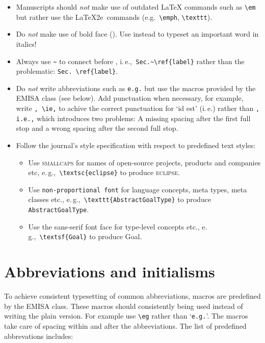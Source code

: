 \documentclass[a4paper]{ltxdoc}
\providecommand*\pkg[1]{\textsf{#1}}
\begin{document}
\begin{itemize}

\item Manuscripts should \emph{not} make use of outdated \LaTeX{} commands such as \verb|\em| but rather use the \LaTeX2e\ commands (e.g.\ \verb|\emph|, \verb|\texttt|). 


\item Do \emph{not} make use of bold face (). Use  instead to typeset an important word in italics!

\item Always use \verb|~| to connect before , i.\,e.,\ \verb|Sec.~\ref{label}| rather than the problematic: \verb|Sec. \ref{label}|.

\item Do \emph{not} write abbreviations such as \verb|e.g.| but use the macros provided by the \pkg{EMISA} class (see below). Add punctuation when necessary, for example, write \verb|, \ie,| to achive the correct punctuation for ‘id est’ (i.\,e.) rather than \verb|, i.e.,| which introduces two problems: A missing spacing after the first full stop and a wrong spacing after the second full stop.



\item Follow the journal's style specification with respect to predefined text styles:

	\begin{itemize}
	\item Use \textsc{smallcaps} for names of open-source projects, products and companies etc, e.\,g.,\ \verb|\textsc{eclipse}| to produce \textsc{eclipse}.
	\item Use \texttt{non-proportional font} for language concepts, meta types, meta classes etc., e.\,g.,\ \verb|\texttt{AbstractGoalType}| to produce \texttt{AbstractGoalType}. 
	\item Use the \textsf{sans-serif font face} for type-level concepts etc., e.\,g.,\ \verb|\textsf{Goal}| to produce \textsf{Goal}.
	\end{itemize}

\end{itemize}







\section{Abbreviations and initialisms}
\DescribeMacro{\eg}\DescribeMacro{\ie}\DescribeMacro{\cf}\DescribeMacro{\etal}%
To achieve consistent typesetting of common abbreviations, macros are predefined by the \pkg{EMISA} class. These macros should consistently being used instead of writing the plain version. For example use \verb|\eg| rather than ‘\verb|e.g.|’. The macros take care of spacing within and after the abbreviations. The list of predefined abbrevations includes: %
\end{document}
